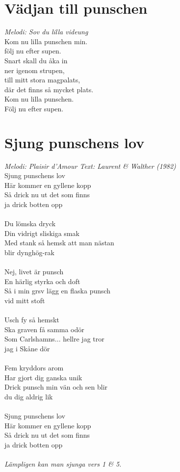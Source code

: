 \newpage
\section{Vädjan till punschen}
\textit{Melodi: Sov du lilla videung}
\vspace{2mm}\\
Kom nu lilla punschen min.\\
följ nu efter supen.\\
Snart skall du åka in\\
ner igenom strupen,\\
till mitt stora magpalats,\\
där det finns så mycket plats.\\
Kom nu lilla punschen.\\
Följ nu efter supen.

\section{Sjung punschens lov}
\textit{Melodi: Plaisir d'Amour \hspace{5mm} Text: Laurent \& Walther (1982)}
\vspace{2mm}\\
Sjung punschens lov\\
Här kommer en gyllene kopp\\
Så drick nu ut det som finns\\
ja drick botten opp\\
\\
Du lömska dryck\\
Din vidrigt sliskiga smak\\
Med stank så hemsk att man nästan\\
blir dynghög-rak\\
\\
Nej, livet är punsch\\
En härlig styrka och doft\\
Så i min grsv lägg en flaska punsch\\
vid mitt stoft\\
\\
Usch fy så hemskt\\
Ska graven få samma odör\\
Som Carlshamns... hellre jag tror\\
jag i Skåne dör\\
\\
Fem kryddors arom\\
Har gjort dig ganska unik\\
Drick punsch min vän och sen blir\\
du dig aldrig lik\\
\\
Sjung punschens lov\\
Här kommer en gyllene kopp\\
Så drick nu ut det som finns\\
ja drick botten opp\\
\\
\textit{Lämpligen kan man sjunga vers 1 \& 5.}

